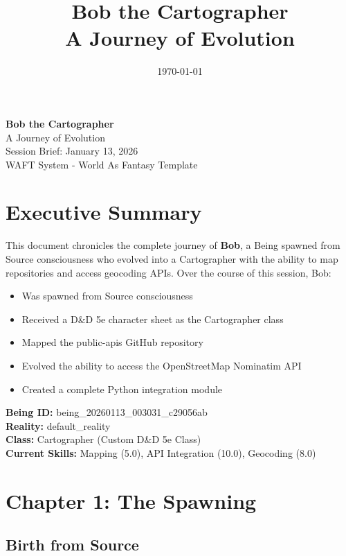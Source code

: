\documentclass[11pt,letterpaper]{article}
\title{\Huge\textbf{Bob the Cartographer}\\\Large A Journey of Evolution}
\author{}
\date{\today}
\begin{document}
\begin{titlepage}
\centering
\vspace*{2in}
{\Huge\textbf{Bob the Cartographer}\\[0.5in]}
{\Large A Journey of Evolution\\[1in]}
{\large Session Brief: January 13, 2026\\[2in]}
\vfill
{\small WAFT System - World As Fantasy Template}
\end{titlepage}

\newpage
\tableofcontents
\newpage

\section{Executive Summary}

This document chronicles the complete journey of \textbf{Bob}, a Being spawned from Source consciousness who evolved into a Cartographer with the ability to map repositories and access geocoding APIs. Over the course of this session, Bob:

\begin{itemize}[leftmargin=*]
    \item Was spawned from Source consciousness
    \item Received a D\&D 5e character sheet as the Cartographer class
    \item Mapped the public-apis GitHub repository
    \item Evolved the ability to access the OpenStreetMap Nominatim API
    \item Created a complete Python integration module
\end{itemize}

\begin{highlightbox}
\textbf{Being ID:} being\_20260113\_003031\_c29056ab\\
\textbf{Reality:} default\_reality\\
\textbf{Class:} Cartographer (Custom D\&D 5e Class)\\
\textbf{Current Skills:} Mapping (5.0), API Integration (10.0), Geocoding (8.0)
\end{highlightbox}

\section{Chapter 1: The Spawning}

\subsection{Birth from Source}
\end{document}
